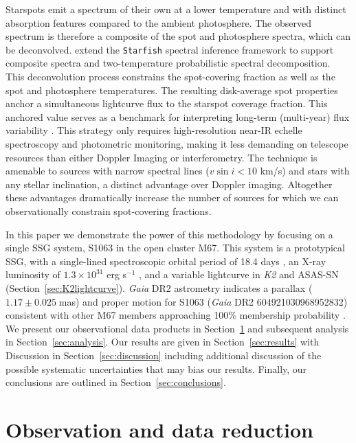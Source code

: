 \documentclass[trackchanges]{aastex631}
\begin{document}
Starspots emit a spectrum of their own at a lower temperature and with distinct absorption features compared to the ambient photosphere. The observed spectrum is therefore a composite of the spot and photosphere spectra, which can be deconvolved.  \citet{gullysantiago17} extend the \texttt{Starfish} \citep{czekala15} spectral inference framework to support composite spectra and two-temperature probabilistic spectral decomposition. This deconvolution process constrains the spot-covering fraction as well as the spot and photosphere temperatures. The resulting disk-average spot properties anchor a simultaneous lightcurve flux to the starspot coverage fraction. This anchored value serves as a benchmark for interpreting long-term (multi-year) flux variability \citep{neff95}. This strategy only requires high-resolution near-IR echelle spectroscopy and photometric monitoring, making it less demanding on telescope resources than either Doppler Imaging or interferometry. The technique is amenable to sources with narrow spectral lines ($v\sin{i}<10$ km/s) and stars with any stellar inclination, a distinct advantage over Doppler imaging.  Altogether these advantages dramatically increase the number of sources for which we can observationally constrain spot-covering fractions.

In this paper we demonstrate the power of this methodology by focusing on a single SSG system, S1063 \citep{1977A&AS...27...89S} in the open cluster M67. This system is a prototypical SSG, with a single-lined spectroscopic orbital period of 18.4 days \citep{geller17}, an X-ray luminosity of $1.3\times10^{31}$ erg s$^{-1}$ \citep{vandenberg99}, and a variable lightcurve in \textit{K2} and ASAS-SN (Section~\ref{sec:K2lightcurve}). \emph{Gaia} DR2 astrometry \citep{2016A&A...595A...1G, 2018A&A...616A...1G} indicates a parallax ($1.17\pm0.025 \;$mas) and proper motion for S1063 (\emph{Gaia} DR2 604921030968952832) consistent with other M67 members  approaching 100\% membership probability \citep{2018ApJ...869....9G}. We present our observational data products in Section~\ref{sec:observations} and subsequent analysis in Section~\ref{sec:analysis}. Our results are given in Section~\ref{sec:results} with Discussion in Section~\ref{sec:discussion} including additional discussion of the possible systematic uncertainties that may bias our results. Finally, our conclusions are outlined in Section~\ref{sec:conclusions}.


\section{Observation and data reduction}
\label{sec:observations}
\end{document}
